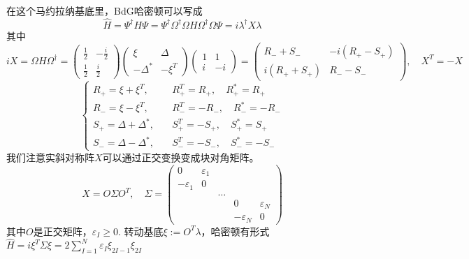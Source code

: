 \documentclass[a4paper]{article}
\numberwithin{equation}{subsection}
\begin{document}
在这个马约拉纳基底里，BdG哈密顿可以写成
\begin{equation}
    \hat{H}=\Psi^\dagger H\Psi=\Psi^\dagger \Omega^\dagger\Omega H\Omega^\dagger \Omega \Psi=i\lambda^\dagger X\lambda
\end{equation}
其中
\begin{equation}
    iX=\Omega H \Omega^\dagger=\begin{pmatrix}
        \frac{1}{2}&-\frac{i}{2}\\
        \frac{1}{2}&\frac{i}{2}
    \end{pmatrix}\begin{pmatrix}
        \xi&\Delta\\
        -\Delta^*&-\xi^T
    \end{pmatrix}\begin{pmatrix}
        1&1\\
        i&-i
    \end{pmatrix}=\begin{pmatrix}
        R_-+S_-&-i(R_+-S_+)\\
        i(R_++S_+)&R_--S_-
    \end{pmatrix},\quad X^T=-X
\end{equation}
\begin{equation}
    \begin{cases}
        R_+=\xi+\xi^T,&\quad R_+^T=R_+,\quad R_+^*=R_+\\
        R_-=\xi-\xi^T,&\quad R_-^T=-R_-,\quad R_-^*=-R_-\\
        S_+=\Delta+\Delta^*,&\quad S_+^T=-S_+,\quad S_+^*=S_+\\
        S_-=\Delta-\Delta^*,&\quad S_-^T=-S_-,\quad S_-^*=-S_-
    \end{cases}
\end{equation}
我们注意实斜对称阵$X$可以通过正交变换变成块对角矩阵。
\begin{equation}
    X=O\Sigma O^T,\quad\Sigma=\begin{pmatrix}
        0&\varepsilon_1\\
        -\varepsilon_1&0\\
        &&\ldots\\
        &&&0&\varepsilon_N\\
        &&&-\varepsilon_N&0
    \end{pmatrix}
\end{equation}
其中$O$是正交矩阵，$\varepsilon_I\geq0$. 转动基底$\xi:=O^T\lambda$，哈密顿有形式$\hat{H}=i\xi^T\Sigma\xi=2\sum_{I=1}^N\varepsilon_I\xi_{2I-1}\xi_{2I}$
\end{document}
